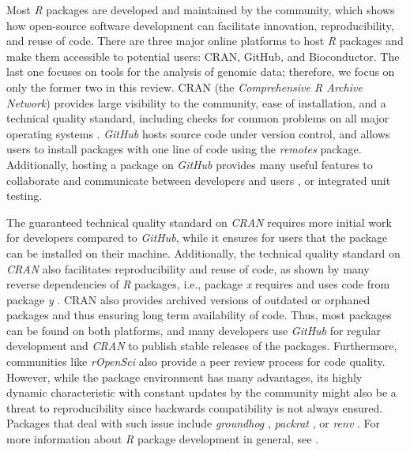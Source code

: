 \documentclass[smallextended]{svjour3}       %
\begin{document}
Most \emph{R} packages are developed and maintained by the community, which shows how open-source software development can facilitate innovation, reproducibility, and reuse of code.
There are three major online platforms to host \emph{R} packages and make them accessible to potential users: CRAN, GitHub, and Bioconductor.
The last one focuses on tools for the analysis of genomic data; therefore, we focus on only the former two in this review.
CRAN (the \emph{Comprehensive R Archive Network}) provides large visibility to the community, ease of installation, and a technical quality standard, including checks for common problems on all major operating systems \cite{Wickham2015}.
\emph{GitHub} hosts source code under version control, and allows users to install packages with one line of code using the \emph{remotes} \cite{Hester2020} package.
Additionally, hosting a package on \emph{GitHub} provides many useful features to collaborate and communicate between developers and users \cite{Wickham2015}, or integrated unit testing.

The guaranteed technical quality standard on \emph{CRAN} requires more initial work for developers compared to \emph{GitHub}, while it ensures for users that the package can be installed on their machine.
Additionally, the technical quality standard on \emph{CRAN} also facilitates reproducibility and reuse of code, as shown by many reverse dependencies of \emph{R} packages, i.e., package \emph{x} requires and uses code from package \emph{y} \cite{vonKrogh2006,St.Laurent2008,Steiniger2009,Prlic2012,Powers2019}.
CRAN also provides archived versions of outdated or orphaned packages and thus ensuring long term availability of code.
Thus, most packages can be found on both platforms, and many developers use \emph{GitHub} for regular development and \emph{CRAN} to publish stable releases of the packages.
Furthermore, communities like \emph{rOpenSci} also provide a peer review process for code quality.
However, while the package environment has many advantages, its highly dynamic characteristic with constant updates by the community might also be a threat to reproducibility since backwards compatibility is not always ensured.
Packages that deal with such issue include \emph{groundhog} \cite{Simonsohn2021}, \emph{packrat} \cite{Ushey2018}, or \emph{renv} \cite{Ushey2020}.
For more information about \emph{R} package development in general, see \cite{Wickham2015}.
\end{document}
